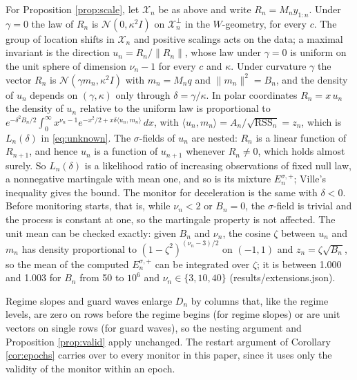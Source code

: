 \documentclass[Afour,sageh,times]{sagej}
\theoremstyle{definition}
\begin{document}
For Proposition \ref{prop:scale}, let $\mathcal{X}_n$ be as above and write $R_n = M_n y_{1:n}$. Under $\gamma = 0$ the law of $R_n$ is $\mathcal{N}(0, \kappa^2 I)$ on $\mathcal{X}_n^{\perp}$ in the $W$-geometry, for every $c$. The group of location shifts in $\mathcal{X}_n$ and positive scalings acts on the data; a maximal invariant is the direction $u_n = R_n/\|R_n\|$, whose law under $\gamma = 0$ is uniform on the unit sphere of dimension $\nu_n - 1$ for every $c$ and $\kappa$. Under curvature $\gamma$ the vector $R_n$ is $\mathcal{N}(\gamma m_n, \kappa^2 I)$ with $m_n = M_n q$ and $\|m_n\|^2 = B_n$, and the density of $u_n$ depends on $(\gamma, \kappa)$ only through $\delta = \gamma/\kappa$. In polar coordinates $R_n = x\,u_n$ the density of $u_n$ relative to the uniform law is proportional to $e^{-\delta^2 B_n/2}\int_0^\infty x^{\nu_n - 1} e^{-x^2/2 + x \delta \langle u_n, m_n\rangle}\, dx$, with $\langle u_n, m_n \rangle = A_n/\sqrt{\mathrm{RSS}_n} = z_n$, which is $L_n(\delta)$ in \eqref{eq:unknown}. The $\sigma$-fields of $u_n$ are nested: $R_n$ is a linear function of $R_{n+1}$, and hence $u_n$ is a function of $u_{n+1}$ whenever $R_n \ne 0$, which holds almost surely. So $L_n(\delta)$ is a likelihood ratio of increasing observations of fixed null law, a nonnegative martingale with mean one, and so is its mixture $E_n^{\sigma,+}$; Ville's inequality gives the bound. The monitor for deceleration is the same with $\delta < 0$. Before monitoring starts, that is, while $\nu_n < 2$ or $B_n = 0$, the $\sigma$-field is trivial and the process is constant at one, so the martingale property is not affected. The unit mean can be checked exactly: given $B_n$ and $\nu_n$, the cosine $\zeta$ between $u_n$ and $m_n$ has density proportional to $(1-\zeta^2)^{(\nu_n-3)/2}$ on $(-1,1)$ and $z_n = \zeta\sqrt{B_n}$, so the mean of the computed $E_n^{\sigma,+}$ can be integrated over $\zeta$; it is between 1.000 and 1.003 for $B_n$ from 50 to $10^6$ and $\nu_n \in \{3, 10, 40\}$ (results/extensions.json).

Regime slopes and guard waves enlarge $D_n$ by columns that, like the regime levels, are zero on rows before the regime begins (for regime slopes) or are unit vectors on single rows (for guard waves), so the nesting argument and Proposition \ref{prop:valid} apply unchanged. The restart argument of Corollary \ref{cor:epochs} carries over to every monitor in this paper, since it uses only the validity of the monitor within an epoch.
\end{document}
